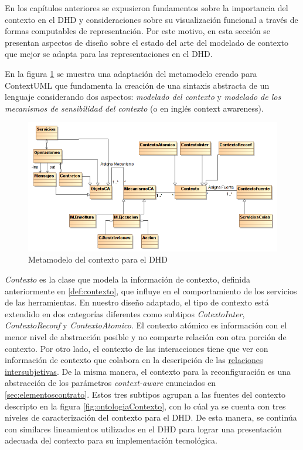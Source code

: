 En los capítulos anteriores se expusieron fundamentos sobre la
importancia del contexto en el DHD y consideraciones sobre su visualización funcional a través de formas computables de representación. Por este motivo, en esta sección se presentan aspectos de
diseño sobre el estado del arte del modelado de contexto que mejor se adapta
para las representaciones en el DHD. 


En la figura \ref{fig:contextMetamodel} se muestra una adaptación del
metamodelo creado para ContextUML\cite{contextUML} que fundamenta la
creación de una sintaxis abstracta de un lenguaje considerando dos
aspectos:
\textit{modelado del contexto} y \textit{modelado de los mecanismos
de sensibilidad del contexto} (o en inglés context awareness).


\begin{figure} 
\begin{center}
 \includegraphics [width=5 in,totalheight=3 in]
{Ch1/Figuras/ContextoDHD}
\caption {Metamodelo del contexto para el DHD}
\label{fig:contextMetamodel}
\end{center}
\end{figure}



\textit{Contexto} es la clase que modela la información de contexto, definida anteriormente en \ref{def:contexto}, que influye en el comportamiento de los servicios de las herramientas. En nuestro diseño adaptado, el tipo de contexto está extendido en dos categorías diferentes como subtipos \textit{CotextoInter}, \textit{ContextoReconf} y \textit{ContextoAtomico}. El contexto atómico es información con el menor
nivel de abstracción posible y no comparte relación con otra porción de
contexto. Por otro lado, el contexto de las interacciones tiene que ver con
información de contexto que colabora en la descripción de las 
\hyperref[intersubjetivas]{relaciones intersubjetivas}. De la misma manera, el
contexto para la reconfiguración es una abstracción de los parámetros
\textit{context-aware} enunciados en \ref{sec:elementoscontrato}. Estos tres
subtipos agrupan a las fuentes del contexto descripto en la figura
\ref{fig:ontologiaContexto}, con lo cúal ya se cuenta con tres niveles de
caracterización del contexto para el DHD. De esta manera, se continúa con similares lineamientos utilizados en el DHD para lograr una presentación adecuada del contexto para su implementación tecnológica. 


